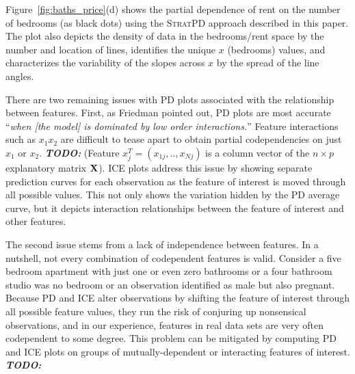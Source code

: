 \documentclass[12pt]{article}
\newcommand{\figref}[1]{Figure~\ref{#1}}
\newcommand{\todo}[1]{{\bf\em TODO:} {{\color{red}{#1}}}}
\newcommand{\spd}{\fontfamily{cmr}\textsc{\small StratPD}}
\begin{document}
\figref{fig:baths_price}(d) shows the partial dependence of rent on the number of bedrooms (as black dots) using the \spd{} approach described in this paper. The plot also depicts the density of data in the bedrooms/rent space by the number and location of lines, identifies the unique $x$ (bedrooms) values, and characterizes the variability of the slopes across $x$ by the spread of the line angles.

There are two remaining issues with PD plots associated with the relationship between features. First, as Friedman pointed out, PD plots are most accurate ``{\em when {\em [the model]} is dominated by low order interactions.}''  Feature interactions such as $x_1x_2$ are difficult to tease apart to obtain partial codependencies on just $x_1$ or $x_2$. \todo{James: should we remove this parenthetical?} (Feature $x_j^T = (x_{1j}, .., x_{Nj})$ is a column vector of the  $n \times p$ explanatory matrix ${\bf X}$). ICE plots address this issue by showing separate prediction curves for each observation as the feature of interest is moved through all possible values.  This not only shows the variation hidden by the PD average curve, but it depicts interaction relationships between the feature of interest and other features.

The second issue stems from a lack of independence between features.  In a nutshell, not every combination of codependent features is valid. Consider a five bedroom apartment with just one or even zero bathrooms or a four bathroom studio was no bedroom or an observation identified as male but also pregnant.  Because PD and ICE alter observations by shifting the feature of interest through all possible feature values, they run the risk of conjuring up nonsensical observations, and in our experience, features in real data sets are very often codependent to some degree. This problem can be mitigated by computing PD and ICE plots on groups of mutually-dependent or interacting features of interest. \todo{but could involve identifying subsets and computing lots of combinations and we still might want to know about a single contribution.}
\end{document}
